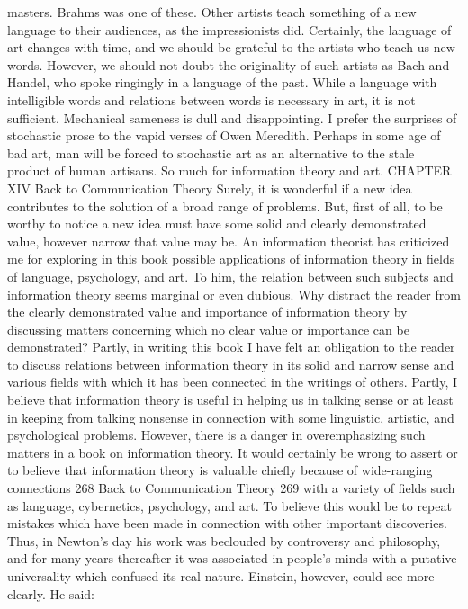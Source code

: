 {{{{{{{{{{{{masters. Brahms was one of these. Other artists teach something
of a new language to their audiences, as the impressionists did.
Certainly, the language of art changes with time, and we should
be grateful to the artists who teach us new words. However, we
should not doubt the originality of such artists as Bach and Handel,
who spoke ringingly in a language of the past.
While a language with intelligible words and relations between
words is necessary in art, it is not sufficient. Mechanical sameness
is dull and disappointing. I prefer the surprises of stochastic prose
to the vapid verses of Owen Meredith. Perhaps in some age of bad
art, man will be forced to stochastic art as an alternative to the
stale product of human artisans.
So much for information theory and art.
CHAPTER XIV Back to
Communication
Theory
Surely, it is wonderful if a new idea contributes to the
solution of a broad range of problems. But, first of all, to be
worthy to notice a new idea must have some solid and clearly
demonstrated value, however narrow that value may be.
An information theorist has criticized me for exploring in this
book possible applications of information theory in fields of language,
psychology, and art. To him, the relation between such
subjects and information theory seems marginal or even dubious.
Why distract the reader from the clearly demonstrated value and
importance of information theory by discussing matters concerning
which no clear value or importance can be demonstrated?
Partly, in writing this book I have felt an obligation to the reader
to discuss relations between information theory in its solid and
narrow sense and various fields with which it has been connected
in the writings of others. Partly, I believe that information theory
is useful in helping us in talking sense or at least in keeping from
talking nonsense in connection with some linguistic, artistic, and
psychological problems. However, there is a danger in overemphasizing
such matters in a book on information theory.
It would certainly be wrong to assert or to believe that information
theory is valuable chiefly because of wide-ranging connections
268
Back to Communication Theory
269
with a variety of fields such as language, cybernetics, psychology,
and art. To believe this would be to repeat mistakes which have
been made in connection with other important discoveries.
Thus, in Newton’s day his work was beclouded by controversy
and philosophy, and for many years thereafter it was associated
in people’s minds with a putative universality which confused its
real nature. Einstein, however, could see more clearly. He said:
}}}}}}}}}}}}
